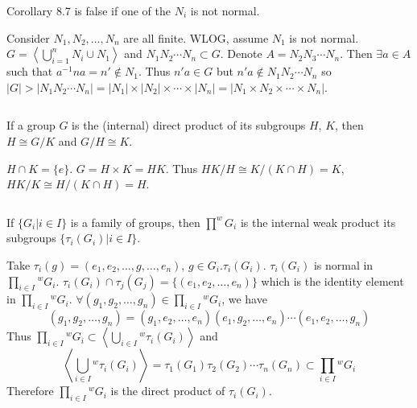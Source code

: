 $$ $$

\begin{ex}
    Corollary 8.7 is false if one of the $N_{i}$ is not normal.
\end{ex}

\begin{answer}
    Consider $N_{1}, N_{2},\dots , N_{n}$ are all finite. WLOG, assume $N_{1}$ is not normal. $G=\left\langle\bigcup\limits_{i=1}^{n}N_{i}\cup N_{1}\right\rangle$ and $N_{1}N_{2}\cdots N_{n}\subset G$. Denote $A=N_{2}N_{3}\cdots N_{n}$. Then $\exists a\in A$ such that $a^{-1}na=n'\notin N_{1}$. Thus $n'a\in G$ but $n'a\notin N_{1}N_{2}\cdots N_{n}$ so $\left| G \right| >\left| N_{1}N_{2}\cdots N_{n} \right| =\left| N_{1} \right|\times\left| N_{2} \right|\times\cdots\times\left| N_{n} \right| =\left| N_{1}\times N_{2}\times\cdots\times N_{n} \right| $.
\end{answer}

$$ $$

\begin{ex}
    If a group $G$ is the (internal) direct product of its subgroups $H$, $K$, then $H\cong G / K$ and $G /H \cong K$.
\end{ex}

\begin{answer}
    $H\cap K=\{e\}$. $G=H\times K=HK$. Thus $HK / H\cong K/(K\cap H)=K$, $HK /K\cong H /(K\cap H)=H$.
\end{answer}

$$ $$

\begin{ex}
    If $\{G_{i}|i\in I\}$ is a family of groups, then $\prod^{w}G_{i}$ is the internal weak product its subgroups $\{\tau_{i}(G_{i})|i\in I\}$.
\end{ex}

\begin{answer}
    Take $\tau_{i}(g)=(e_{1}, e_{2},\dots, g,\dots,e_{n})$, $g\in G_{i}$.$\tau_{i}(G_{i})$. $\tau_{i}(G_{i})$ is normal in $\prod\limits_{i\in I}{^{w}}G_{i}$. $\tau_{i}(G_{i})\cap \tau_{j}(G_{j})=\{(e_{1}, e_{2}, \dots , e_{n})\}$ which is the identity element in $\prod\limits_{i\in I}{^{w}}G_{i}$. $\forall (g_{1}, g_{2},\dots, g_{n})\in \prod\limits_{i\in I}{^{w}}G_{i}$, we have \[(g_{1}, g_{2}, \dots, g_{n})=(g_{1},e_{2},\dots, e_{n})(e_{1}, g_{2}, \dots, e_{n})\cdots(e_{1}, e_{2}, \dots, g_{n})\] Thus $\prod\limits_{i\in I}{^{w}}G_{i}\subset \left\langle\bigcup\limits_{i\in I}{^{w}}\tau_{i}(G_{i})\right\rangle$ and \[\left\langle\bigcup\limits_{i\in I}{^{w}}\tau_{i}(G_{i})\right\rangle=\tau_{1}(G_{1})\tau_{2}(G_{2})\cdots \tau_{n}(G_{n})\subset \prod\limits_{i\in I}{^{w}}G_{i}\] Therefore $\prod\limits_{i\in I}{^{w}}G_{i}$ is the direct product of $\tau_{i}(G_{i})$.
\end{answer}

